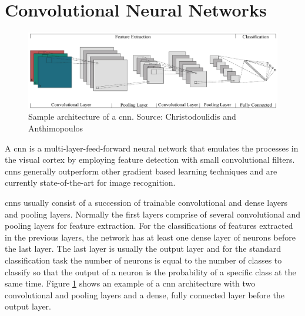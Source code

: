 \section{Convolutional Neural Networks}
\begin{figure}[ht]
	\centering
	\includegraphics[scale=0.35]{figures/theoryCNN_model}
	\caption{Sample architecture of a \gls{cnn}. Source: Christodoulidis and Anthimopoulos \cite{Christodoulidis2015}}
	\label{fig:cnnModel}
\end{figure}
A \acrfull{cnn} is a multi-layer-feed-forward neural network that emulates the processes in the visual cortex by employing feature detection with small convolutional filters. \glspl{cnn} generally outperform other gradient based learning techniques \cite{LeCun1998} and are currently state-of-the-art \cite{Russakovsky2015} for image recognition.

\glspl{cnn} usually consist of a succession of trainable convolutional and dense layers and pooling layers. Normally the first layers comprise of several convolutional and pooling layers for feature extraction. For the classifications of features extracted in the previous layers, the network has at least one dense layer of neurons before the last layer. The last layer is usually the output layer and for the standard classification task the number of neurons is equal to the number of classes to classify so that the output of a neuron is the probability of a specific class at the same time. Figure \ref{fig:cnnModel} shows an example of a \gls{cnn} architecture with two convolutional and pooling layers and a dense, fully connected layer before the output layer. 


